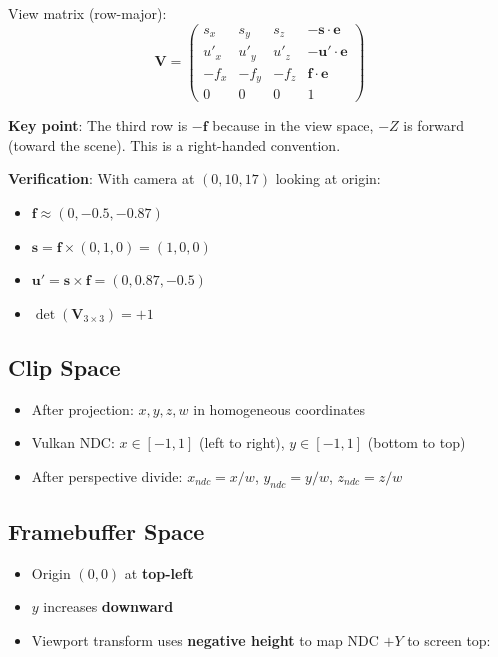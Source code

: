 \documentclass{article}
\begin{document}
View matrix (row-major):
\[
\mathbf{V} = \begin{pmatrix}
s_x & s_y & s_z & -\mathbf{s} \cdot \mathbf{e} \\
u'_x & u'_y & u'_z & -\mathbf{u'} \cdot \mathbf{e} \\
-f_x & -f_y & -f_z & \mathbf{f} \cdot \mathbf{e} \\
0 & 0 & 0 & 1
\end{pmatrix}
\]

\textbf{Key point}: The third row is $-\mathbf{f}$ because in the view space, $-Z$ is forward (toward the scene). This is a right-handed convention.

\textbf{Verification}: With camera at $(0,10,17)$ looking at origin:
\begin{itemize}
\item $\mathbf{f} \approx (0, -0.5, -0.87)$
\item $\mathbf{s} = \mathbf{f} \times (0,1,0) = (1, 0, 0)$ \checkmark
\item $\mathbf{u'} = \mathbf{s} \times \mathbf{f} = (0, 0.87, -0.5)$ \checkmark
\item $\det(\mathbf{V}_{3\times3}) = +1$ \checkmark
\end{itemize}

\subsection{Clip Space}
\begin{itemize}
\item After projection: $x, y, z, w$ in homogeneous coordinates
\item Vulkan NDC: $x \in [-1, 1]$ (left to right), $y \in [-1, 1]$ (bottom to top)
\item After perspective divide: $x_{ndc} = x/w$, $y_{ndc} = y/w$, $z_{ndc} = z/w$
\end{itemize}

\subsection{Framebuffer Space}
\begin{itemize}
\item Origin $(0, 0)$ at \textbf{top-left}
\item $y$ increases \textbf{downward}
\item Viewport transform uses \textbf{negative height} to map NDC $+Y$ to screen top:
\end{itemize}
\end{document}
